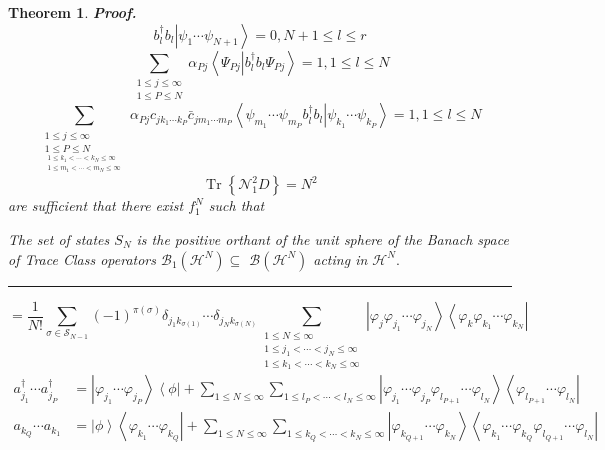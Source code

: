 \documentclass[aps,preprint]{revtex4}%
\newtheorem{theorem}{Theorem}
\newenvironment{proof}[1][Proof]{\noindent\textbf{#1.} }{\ \rule{0.5em}{0.5em}}
\begin{document}
\begin{theorem}
\begin{proof}
\begin{equation}
b_{l}^{\dagger}b_{l}\left\vert \psi_{1}\cdots\psi_{N+1}\right\rangle
=0,N+1\leq l\leq r
\end{equation}%
\begin{equation}
\sum_{\substack{1\leq j\leq\infty\\1\leq P\leq N}}\alpha_{Pj}\left\langle
\Psi_{Pj}\left\vert b_{l}^{\dagger}b_{l}\right.  \Psi_{Pj}\right\rangle
=1,1\leq l\leq N
\end{equation}%
\begin{equation}
\sum_{\substack{1\leq j\leq\infty\\1\leq P\leq N\\_{\substack{1\leq
k_{1}<\cdots<k_{N}\leq\infty\\1\leq m_{1}<\cdots<m_{N}\leq\infty}}}%
}\alpha_{Pj}c_{jk_{1}\cdots k_{P}}\bar{c}_{jm_{1}\cdots m_{P}}\left\langle
\psi_{m_{1}}\cdots\psi_{m_{P}}b_{l}^{\dagger}b_{l}\left\vert \psi_{k_{1}%
}\cdots\psi_{k_{P}}\right.  \right\rangle =1,1\leq l\leq N
\end{equation}%
\begin{equation}
\operatorname*{Tr}\left\{  \mathcal{N}_{1}^{2}D\right\}  =N^{2}%
\end{equation}
are sufficient that there exist $f_{1}^{N}$ such that

The set of states $S_{N}$ is the positive orthant of the unit sphere of the
Banach space of Trace Class operators $\mathcal{B}_{1}\left(  \mathcal{H}%
^{N}\right)  \subseteq$ $\mathcal{B}\left(  \mathcal{H}^{N}\right)  $ acting
in $\mathcal{H}^{N}.$
\end{proof}
\end{theorem}

%

\begin{equation}
=\frac{1}{N!}\sum_{\sigma\in\mathcal{S}_{N-1}}\left(  -1\right)  ^{\pi\left(
\sigma\right)  }\delta_{j_{1}k_{\sigma\left(  1\right)  }}\cdots\delta
_{j_{N}k_{\sigma\left(  N\right)  }}\sum_{\substack{1\leq N\leq\infty\\1\leq
j_{1}<\cdots<j_{N}\leq\infty\\1\leq k_{1}<\cdots<k_{N}\leq\infty}}\left\vert
\varphi_{j}\varphi_{j_{1}}\cdots\varphi_{j_{N}}\right\rangle \left\langle
\varphi_{k}\varphi_{k_{1}}\cdots\varphi_{k_{N}}\right\vert
\end{equation}%
\begin{align}
a_{j_{1}}^{\dagger}\cdots a_{j_{P}}^{\dagger}  &  =\left\vert \varphi_{j_{1}%
}\cdots\varphi_{j_{P}}\right\rangle \left\langle \phi\right\vert +\sum_{1\leq
N\leq\infty}\sum_{1\leq l_{P}<\cdots<l_{N}\leq\infty}\left\vert \varphi
_{j_{1}}\cdots\varphi_{j_{P}}\varphi_{l_{P+1}}\cdots\varphi_{l_{N}%
}\right\rangle \left\langle \varphi_{l_{P+1}}\cdots\varphi_{l_{N}}\right\vert
\nonumber\\
a_{k_{Q}}\cdots a_{k_{1}}  &  =\left\vert \phi\right\rangle \left\langle
\varphi_{k_{1}}\cdots\varphi_{k_{Q}}\right\vert +\sum_{1\leq N\leq\infty}%
\sum_{1\leq k_{Q}<\cdots<k_{N}\leq\infty}\left\vert \varphi_{k_{Q+1}}%
\cdots\varphi_{k_{N}}\right\rangle \left\langle \varphi_{k_{1}}\cdots
\varphi_{k_{Q}}\varphi_{l_{Q+1}}\cdots\varphi_{l_{N}}\right\vert
\end{align}
\end{document}

